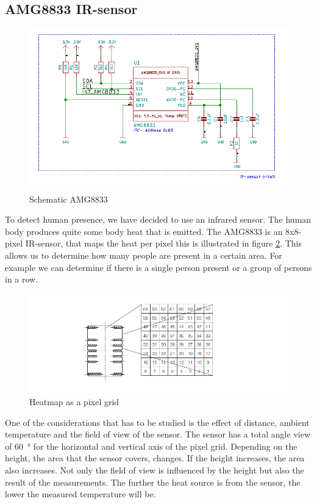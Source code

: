 \documentclass[11pt,a4paper]{article}
\begin{document}
\subsection{AMG8833 IR-sensor}
\begin{figure}[H]
	\centering
	\includegraphics[width=0.8\linewidth]{Schematic_AMG8833.png}
	\caption{Schematic AMG8833}
	\label{fig:AMG8833}
\end{figure}
To detect human presence, we have decided to use an infrared sensor. The human body produces quite some body heat that is emitted. The AMG8833 is an 8x8-pixel IR-sensor, that maps the heat per pixel this is illustrated in figure \ref{fig:heatmap}. This allows us to determine how many people are present in a certain area. For example we can determine if there is a single person present or a group of persons in a row.
\begin{figure}[H]
	\centering
	\includegraphics[width=0.8\linewidth]{heat_map_AMG8833.png}
	\caption{Heatmap as a pixel grid}
	\label{fig:heatmap}
\end{figure}
One of the considerations that has to be studied is the effect of distance, ambient temperature and the field of view of the sensor. The sensor has a total angle view of \SI{60}{\degree} \label{fig:angleview} for the horizontal and vertical axis of the pixel grid. Depending on the height, the area that the sensor covers, changes. If the height increases, the area also increases. Not only the field of view is influenced by the height but also the result of the measurements. The further the heat source is from the sensor, the lower the measured temperature will be.
\end{document}
